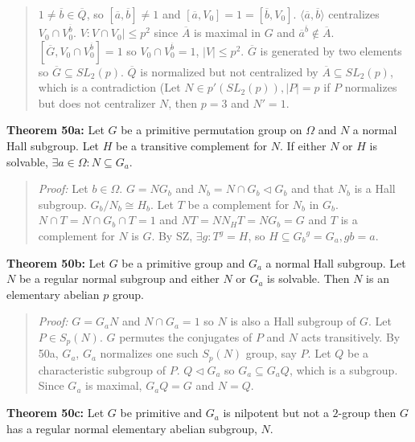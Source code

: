 \begin{quote}
$1 \neq {\overline b} \in {\overline Q}$, so $[{\overline a}, {\overline b}] \neq 1$ and
$[{\overline a}, V_0] = 1 = [{\overline b}, V_0]$.  $ \langle {\overline a}, {\overline b} \rangle$ centralizes
$V_0 \cap V_0^{\overline b}$.  $V: V \cap V_0| \leq p^2$ since ${\overline A}$ is maximal in $G$ and
${\overline a}^{\overline b} \notin {\overline A}$. $[{\overline G}, V_0 \cap V_0^{\overline b}] = 1$ so
$V_0 \cap V_0^{\overline b} = 1$, $|V| \leq p^2$.  ${\overline G}$ is generated by two elements so
${\overline G} \subseteq SL_2(p)$.  ${\overline Q}$ is normalized but not centralized by 
${\overline A} \subseteq SL_2(p)$, which is a contradiction (Let $N \in p'(SL_2(p)), |P|= p$ if
$P$ normalizes but does not centralizer $N$, then $p=3$ and $N'=1$.
\end{quote}
{\bf Theorem 50a:} 
Let $G$ be a primitive permutation group on $\Omega$ and $N$ a normal Hall subgroup.  Let $H$ be a transitive complement for $N$.
If either $N$ or $H$ is solvable, $\exists a \in \Omega: N \subseteq G_a$.
\begin{quote}
\emph{Proof:}
Let $b \in \Omega$.  $G= NG_b$ and $N_b = N \cap G_b \lhd G_b$ and that $N_b$ is a Hall subgroup.  $G_b/N_b \cong H_b$.
Let $T$ be a complement for $N_b$ in $G_b$.  $N \cap T = N \cap G_b \cap T =1$ and $NT= N N_H T = N G_b = G$ and
$T$ is a complement for $N$ is $G$.  By SZ, $\exists g: T^g=H$, so $H \subseteq {G_b}^g = G_a, gb=a$.
\end{quote}
{\bf Theorem 50b:}  Let $G$ be a primitive group and $G_a$ a normal Hall subgroup.  Let $N$ be a regular normal subgroup
and either $N$ or $G_a$ is solvable.  Then $N$ is an elementary abelian $p$ group.
\begin{quote}
\emph{Proof:}
$G= G_aN$ and $N \cap G_a = 1$ so $N$ is also a Hall subgroup of $G$.  Let $P \in S_p(N)$.  $G$ permutes the conjugates
of $P$ and $N$ acts transitively.  By 50a, $G_a$, $G_a$ normalizes one such $S_p(N)$ group, say $P$.  Let $Q$ be a characteristic
subgroup of $P$.  $Q \lhd G_a$ so $G_a \subseteq G_aQ$, which is a subgroup.  Since $G_a$ is maximal, $G_aQ = G$ and $N=Q$.
\end{quote}
{\bf Theorem 50c:} Let $G$ be primitive and $G_a$ is nilpotent but not a $2$-group then $G$ has a regular
normal elementary abelian subgroup, $N$.
